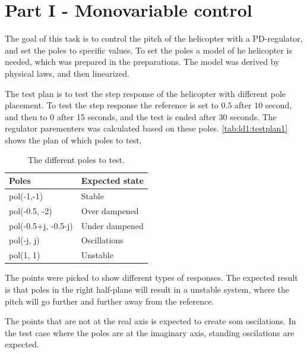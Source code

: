 \section{Part I - Monovariable control}
The goal of this task is to control the pitch of the helicopter with a PD-regulator, and set the poles to specific values. To set the poles a model of he helicopter is needed, which was prepared in the preparations. The model was derived by physical laws, and then linearized.

The test plan is to test the step response of the helicopter with different pole placement. To test the step response the reference is set to $0.5$ after $10$ second, and then to $0$ after 15 seconds, and the test is ended after $30$ seconds. The regulator parementers was calculated based on these poles. \autoref{tab:ld1:testplan1} shows the plan of which poles to test.

\begin{table}[h]
    \centering
    \begin{tabular}{ l|l } 
        Poles & Expected state \\ \hline
        pol(-1,-1) & Stable \\
        pol(-0.5, -2) & Over dampened \\
        pol(-0.5+j, -0.5-j) & Under dampened \\
        pol(-j, j) & Oscillations \\
        pol(1, 1) & Unstable \\
    \end{tabular}
    \caption{The different poles to test.}
    \label{tab:ld1:testplan1}
\end{table}

The points were picked to show different types of responses. The expected result is that poles in the right half-plane will result in a unstable system, where the pitch will go further and further away from the reference.

The points that are not at the real axis is expected to create som oscilations. In the test case where the poles are at the imaginary axis, standing oscilations are expected.

